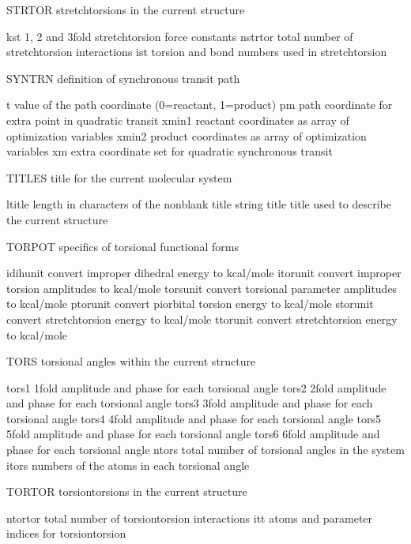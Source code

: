 \documentclass[letterpaper,11pt,english]{sphinxmanual}
\begin{document}
STRTOR  stretch\sphinxhyphen{}torsions in the current structure

kst     1\sphinxhyphen{}, 2\sphinxhyphen{} and 3\sphinxhyphen{}fold stretch\sphinxhyphen{}torsion force constants
nstrtor total number of stretch\sphinxhyphen{}torsion interactions
ist     torsion and bond numbers used in stretch\sphinxhyphen{}torsion

SYNTRN  definition of synchronous transit path

t       value of the path coordinate (0=reactant, 1=product)
pm      path coordinate for extra point in quadratic transit
xmin1   reactant coordinates as array of optimization variables
xmin2   product coordinates as array of optimization variables
xm      extra coordinate set for quadratic synchronous transit

TITLES  title for the current molecular system

ltitle  length in characters of the nonblank title string
title   title used to describe the current structure

TORPOT  specifics of torsional functional forms

idihunit        convert improper dihedral energy to kcal/mole
itorunit        convert improper torsion amplitudes to kcal/mole
torsunit        convert torsional parameter amplitudes to kcal/mole
ptorunit        convert pi\sphinxhyphen{}orbital torsion energy to kcal/mole
storunit        convert stretch\sphinxhyphen{}torsion energy to kcal/mole
ttorunit        convert stretch\sphinxhyphen{}torsion energy to kcal/mole

TORS    torsional angles within the current structure

tors1   1\sphinxhyphen{}fold amplitude and phase for each torsional angle
tors2   2\sphinxhyphen{}fold amplitude and phase for each torsional angle
tors3   3\sphinxhyphen{}fold amplitude and phase for each torsional angle
tors4   4\sphinxhyphen{}fold amplitude and phase for each torsional angle
tors5   5\sphinxhyphen{}fold amplitude and phase for each torsional angle
tors6   6\sphinxhyphen{}fold amplitude and phase for each torsional angle
ntors   total number of torsional angles in the system
itors   numbers of the atoms in each torsional angle

TORTOR  torsion\sphinxhyphen{}torsions in the current structure

ntortor total number of torsion\sphinxhyphen{}torsion interactions
itt     atoms and parameter indices for torsion\sphinxhyphen{}torsion
\end{document}
